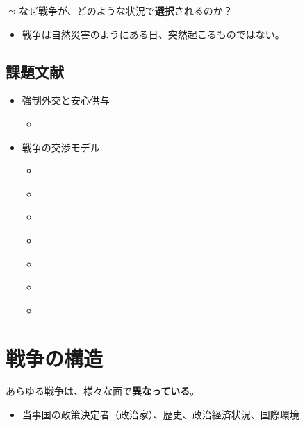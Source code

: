 \documentclass[
  xelatex,
  ja=standard]{bxjsarticle}
\providecommand{\tightlist}{%
  \setlength{\itemsep}{0pt}\setlength{\parskip}{0pt}}\usepackage{longtable,booktabs,array}
\begin{document}
\(\leadsto\)なぜ戦争が、どのような状況で\textbf{選択}されるのか？

\begin{itemize}
\tightlist
\item
  戦争は自然災害のようにある日、突然起こるものではない。
\end{itemize}

\hypertarget{ux8ab2ux984cux6587ux732e}{%
\subsection*{課題文献}\label{ux8ab2ux984cux6587ux732e}}

\begin{itemize}
\tightlist
\item
  強制外交と安心供与

  \begin{itemize}
  \tightlist
  \item
    \citet[第3章]{nakanishi2013}
  \end{itemize}
\item
  戦争の交渉モデル

  \begin{itemize}
  \tightlist
  \item
    \citet[第2章]{tago2020}
  \item
    \citet[第10章]{sunahara2020}
  \item
    \citet[第2章]{sakamoto2020}
  \item
    \citet[第4章]{ohshiba2018}
  \item
    \citet[第11章]{asako2018}
  \item
    \citet[第6章]{okada2020}
  \item
    \citet[第1章]{ishiguro2019}
  \end{itemize}
\end{itemize}

\hypertarget{ux6226ux4e89ux306eux69cbux9020}{%
\section{戦争の構造}\label{ux6226ux4e89ux306eux69cbux9020}}

あらゆる戦争は、様々な面で\textbf{異なっている}。

\begin{itemize}
\tightlist
\item
  当事国の政策決定者（政治家）、歴史、政治経済状況、国際環境
\end{itemize}
\end{document}

